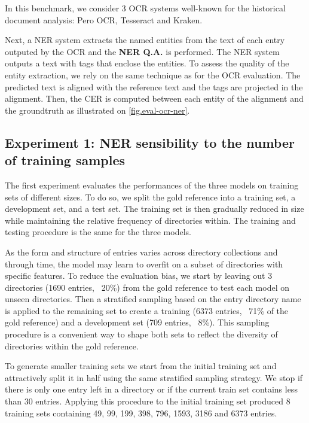 In this benchmark, we consider 3 OCR systems well-known for the historical document analysis: Pero OCR, Tesseract and Kraken. 



Next, a NER system extracts the named entities from the text of each entry outputed by the OCR and the \textbf{NER Q.A.}
is performed. The NER system outputs a text with tags that enclose the entities. To assess the quality of the entity
extraction, we rely on the same technique as for the OCR evaluation. The predicted text is aligned with the reference
text and the tags are projected in the alignment. Then, the CER  is computed between each entity of the alignment and the
groundtruth as illustrated on \cref{fig.eval-ocr-ner}.

\subsection{Experiment 1: NER sensibility to the number of training samples}
The first experiment evaluates the performances of the three models on training sets of different sizes.
To do so, we split the gold reference into a training set, a development set, and a test set. The training set is then gradually reduced in size while maintaining the relative frequency of directories within.
The training and testing procedure is the same for the three models.

As the form and structure of entries varies across directory collections and through time, the model may learn to overfit on a subset of directories with specific features.
To reduce the evaluation bias, we start by leaving out 3 directories (1690 entries, ~20\%) from the gold reference to test each model on unseen directories.
Then a stratified sampling based on the entry directory name is applied to the remaining set to create a training (6373 entries, ~71\% of the gold reference) and a development set (709 entries, ~8\%).
This sampling procedure is a convenient way to shape both sets to reflect the diversity of directories within the gold reference.

To generate smaller training sets we start from the initial training set and attractively split it in half using the same stratified sampling strategy.
We stop if there is only one entry left in a directory or if the current train set contains less than 30 entries.
Applying this procedure to the initial training set produced 8 training sets containing 49, 99, 199, 398, 796, 1593, 3186 and 6373 entries.

